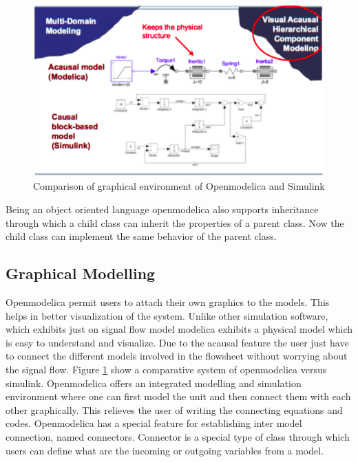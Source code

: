 \documentclass[12pt]{report}
\begin{document}
\begin{figure}[t]
\centering
\includegraphics[width=1\linewidth]{om1}
\caption{Comparison of graphical environment of Openmodelica and Simulink \cite{PeterFrit}}
\label{fig:OM1}
\end{figure}

Being an object oriented language openmodelica also supports inheritance through which a child class can inherit the properties of a parent class. Now the child class can implement the same behavior of the parent class.

\subsection{Graphical Modelling}
Openmodelica permit users to attach their own graphics to the models. This helps in better visualization of the system. Unlike other simulation software, which exhibits just on signal flow model modelica exhibits a physical model which is easy to understand and visualize. Due to the acausal feature the user just have to connect the different models involved in the flowsheet without worrying about the signal flow. Figure \ref{fig:OM1} show a comparative system of openmodelica versus simulink.
Openmodelica offers an integrated modelling and simulation environment where one can first model the unit and then connect them with each other graphically. This relieves the user of writing the connecting equations and codes. Openmodelica has a special feature for establishing inter model connection, named connectors. Connector is a special type of class through which users can define what are the incoming or outgoing variables from a model.
\end{document}
